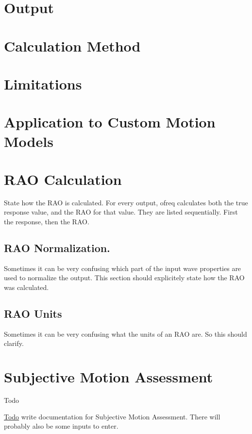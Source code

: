 \section*{Output}

\section*{Calculation Method}

\section*{Limitations}

\section*{Application to Custom Motion Models}

\section*{R\-A\-O Calculation}

State how the R\-A\-O is calculated. For every output, ofreq calculates both the true response value, and the R\-A\-O for that value. They are listed sequentially. First the response, then the R\-A\-O.

\subsection*{R\-A\-O Normalization.}

Sometimes it can be very confusing which part of the input wave properties are used to normalize the output. This section should explicitely state how the R\-A\-O was calculated.

\subsection*{R\-A\-O Units}

Sometimes it can be very confusing what the units of an R\-A\-O are. So this should clarify. \hypertarget{local_sma}{}\section{Subjective Motion Assessment}\label{local_sma}
\begin{DoxyRefDesc}{Todo}
\item[\hyperlink{todo__todo000028}{Todo}]write documentation for Subjective Motion Assessment. There will probably also be some inputs to enter.\end{DoxyRefDesc}



